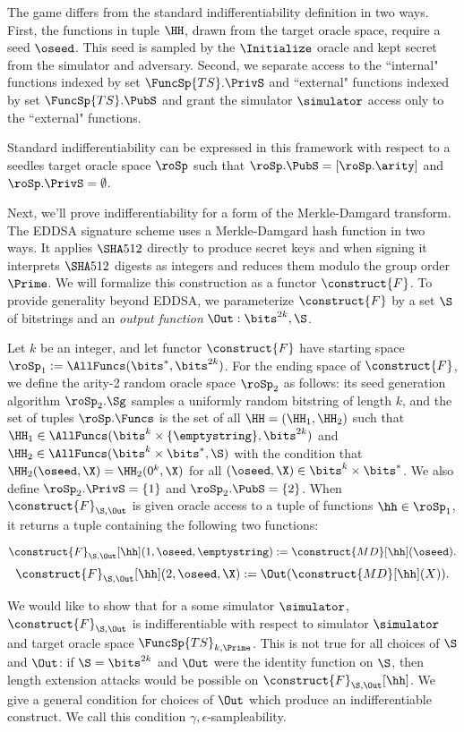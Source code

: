 The game differs from the standard indifferentiability definition in two ways. First, the functions in tuple $\HH$,  drawn from the target oracle space, require a seed $\oseed$. This seed is sampled by the $\Initialize$ oracle and kept secret from the simulator and adversary. Second, we separate access to the ``internal" functions indexed by set $\FuncSp{TS}.\PrivS$ and ``external" functions indexed by set $\FuncSp{TS}.\PubS$ and grant the simulator $\simulator$ access only to the ``external" functions.

Standard indifferentiability can be expressed in this framework with respect to a seedles target oracle space $\roSp$ such that $\roSp.\PubS = [\roSp.\arity]$ and $\roSp.\PrivS = \emptyset$. 

Next, we'll prove indifferentiability for a form of the Merkle-Damgard transform.
The EDDSA signature scheme uses a Merkle-Damgard hash function in two ways. 
It applies $\SHA512$ directly to produce secret keys and when signing it interprets $\SHA512$ digests as integers and reduces them modulo the group order $\Prime$.
We will formalize this construction as a functor $\construct{F}$. 
To provide generality beyond EDDSA, we parameterize $\construct{F}$ by a set $\S$ of bitstrings and an \textit{output function} $\Out: \bits^{2k}, \S$. 

Let $k$ be an integer, and let functor $\construct{F}$ have starting space  $\roSp_1 := \AllFuncs(\bits^*,\bits^{2k})$. For the ending space of $\construct{F}$, we define the arity-2 random oracle space $\roSp_2$ as follows: its seed generation algorithm $\roSp_2.\Sg$ samples a uniformly random bitstring of length $k$, and the set of tuples $\roSp.\Funcs$ is the set of all $\HH = (\HH_1, \HH_2)$ such that $\HH_1 \in \AllFuncs(\bits^k \times \{\emptystring\}, \bits^{2k})$ and $\HH_2 \in \AllFuncs(\bits^k \times \bits^*, \S)$ with the condition that $\HH_2(\oseed, \X) = \HH_2(0^k, \X)$ for all $(\oseed, \X) \in \bits^k \times \bits^*$. 
We also define $\roSp_2.\PrivS = \{1\}$ and $\roSp_2.\PubS = \{2\}$.
When $\construct{F}_{\S, \Out}$ is given oracle access to a tuple of functions $\hh \in \roSp_1$, it returns a tuple containing the following two functions:

\[\construct{F}_{\S,\Out}[\hh](1, \oseed,\emptystring) := \construct{MD}[\hh](\oseed).\]
\[\construct{F}_{\S,\Out}[\hh](2, \oseed,\X) := \Out(\construct{MD}[\hh](X)).\]

We would like to show that for a some simulator $\simulator$, $\construct{F}_{\S,\Out}$ is indifferentiable with respect to simulator $\simulator$ and target oracle space $\FuncSp{TS}_{k,\Prime}$.
This is not true for all choices of $\S$ and $\Out$: if $\S = \bits^{2k}$ and $\Out$ were the identity function on $\S$, then length extension attacks would be possible on $\construct{F}_{\S, \Out}[\hh]$.
We give a general condition for choices of $\Out$ which produce an indifferentiable construct. We call this condition $\gamma,\epsilon$-sampleability.

